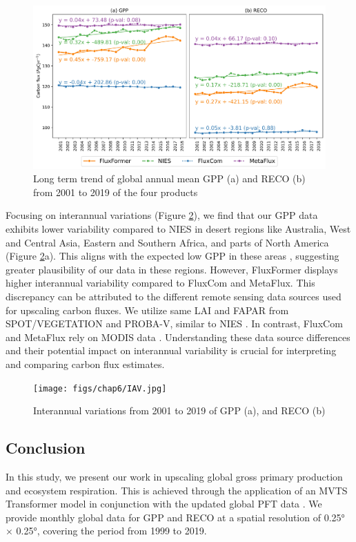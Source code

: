 \begin{figure}[tbh!]
    \centering
    \includegraphics[width=\textwidth]{figs/chap6/global_annual_timeseries.jpg}
    \caption[Long term trend and latitudinal distribution of GPP and RECO]{Long term trend of global annual mean GPP (a) and RECO (b) from 2001 to 2019 of the four products}
    \label{fig:chap6_fig7}
\end{figure}

Focusing on interannual variations (Figure \ref{fig:chap6_fig8}), we find that our GPP data exhibits lower variability compared to NIES in desert regions like Australia, West and Central Asia, Eastern and Southern Africa, and parts of North America (Figure \ref{fig:chap6_fig8}a). This aligns with the expected low GPP in these areas \citep{hadley1981productivity}, suggesting greater plausibility of our data in these regions. However, FluxFormer displays higher interannual variability compared to FluxCom and MetaFlux. This discrepancy can be attributed to the different remote sensing data sources used for upscaling carbon fluxes. We utilize same LAI and FAPAR from SPOT/VEGETATION and PROBA-V, similar to NIES \citep{zeng2020global}. In contrast, FluxCom and MetaFlux rely on MODIS data \citep{jung2019fluxcom, nathaniel2023metaflux}. Understanding these data source differences and their potential impact on interannual variability is crucial for interpreting and comparing carbon flux estimates.\par

\begin{figure}[tbh!]
    \centering
    \texttt{[image: figs/chap6/IAV.jpg]}
    \caption[Interannual variations from 2001 to 2019 of GPP and RECO]{Interannual variations from 2001 to 2019 of GPP (a), and RECO (b)}
    \label{fig:chap6_fig8}
\end{figure}
\subsection{Conclusion}
In this study, we present our work in upscaling global gross primary production and ecosystem respiration. This is achieved through the application of an MVTS Transformer model \citep{zerveas2021transformer} in conjunction with the updated global PFT data \citep{harper202229}. We provide monthly global data for GPP and RECO at a spatial resolution of 0.25° × 0.25°, covering the period from 1999 to 2019. \par

